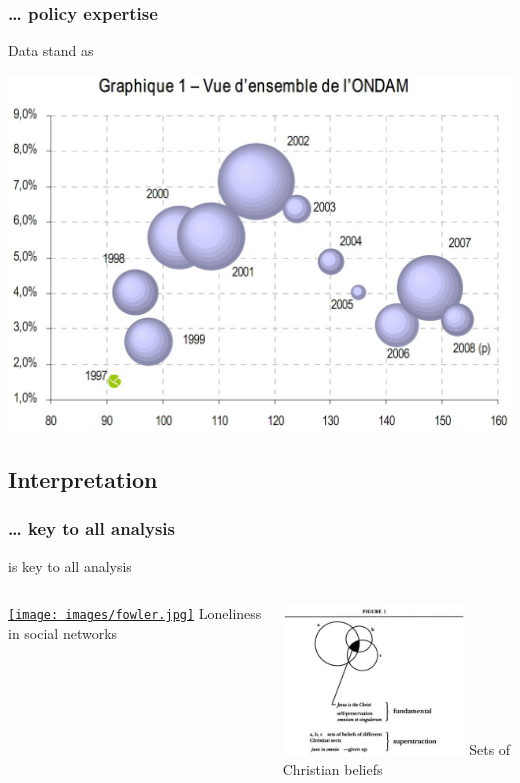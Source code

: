 \documentclass{beamer}
\begin{document}
	\subsubsection{… policy expertise}

	\begin{frame}[c]{Data stand as }
		\begin{center}
			\href{http://www.securite-sociale.fr/chiffres/ccss/notesconj/conj200903.pdf}{\includegraphics[width=.85\textwidth]{images/ondam.jpg}}
		\end{center}		
	\end{frame}
	
	\subsection{Interpretation}

	\subsubsection{… key to all analysis}
	
	\begin{frame}[c]{ is key to all analysis}

		\begin{columns}[T]
			\begin{center}
				\href{http://jhfowler.ucsd.edu/alone_in_the_crowd.pdf}{\texttt{[image: images/fowler.jpg]}}\vspace{1cm}
				Loneliness in social networks
			\end{center}
			\begin{center}
				\href{http://books.google.fr/books?id=gvgCYyFN7RIC&pg=PA19&lpg=PA19}{\includegraphics[height=4cm]{images/jesus.jpg}}\vspace{1.05cm}
				Sets of Christian beliefs
			\end{center}
		\end{columns}			
	\end{frame}
\end{document}
